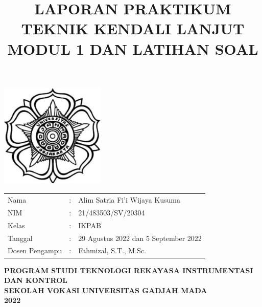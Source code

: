 \documentclass[12 pt]{article}
\title{\large \textbf{LAPORAN PRAKTIKUM TEKNIK KENDALI LANJUT} \\ \textbf{MODUL 1 DAN LATIHAN SOAL}\linebreak}
\author{}
\date{}
\begin{document}
\clearpage
\maketitle
\thispagestyle{empty} %

\begin{center}
\includegraphics[width=5cm,height=5cm]{cover_laporan/logo_ugm.png}
\end{center}

\vspace{1 cm}

\begin{center}
\begin{tabular}{lcl}
Nama & : & Alim Satria Fi'i Wijaya Kusuma \\
NIM & : & 21/483503/SV/20304\\
Kelas & : & IKPAB\\
Tanggal & : & 29 Agustus 2022 dan 5 September 2022 \\
Dosen Pengampu & : & Fahmizal, S.T., M.Sc.
\end{tabular}
\newline
\newline
\newline
\newline
\newline
\large{\textbf{PROGRAM STUDI TEKNOLOGI REKAYASA INSTRUMENTASI DAN KONTROL}} \\
\textbf{SEKOLAH VOKASI UNIVERSITAS GADJAH MADA} \\
\textbf{2022}
\end{center}

\pagebreak


\end{document}

